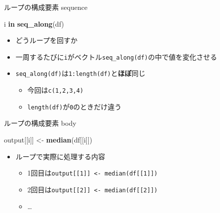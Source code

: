 \documentclass[ignorenonframetext,]{beamer}
\newenvironment{Shaded}{\begin{snugshade}}{\end{snugshade}}
\newcommand{\KeywordTok}[1]{\textcolor[rgb]{0.13,0.29,0.53}{\textbf{#1}}}
\newcommand{\StringTok}[1]{\textcolor[rgb]{0.31,0.60,0.02}{#1}}
\newcommand{\ControlFlowTok}[1]{\textcolor[rgb]{0.13,0.29,0.53}{\textbf{#1}}}
\newcommand{\NormalTok}[1]{#1}
\providecommand{\tightlist}{%
  \setlength{\itemsep}{0pt}\setlength{\parskip}{0pt}}
\begin{document}
\begin{frame}[fragile]{ループの構成要素 sequence}

\begin{Shaded}
\begin{Highlighting}[]
\NormalTok{i }\ControlFlowTok{in} \KeywordTok{seq_along}\NormalTok{(df)}
\end{Highlighting}
\end{Shaded}

\begin{itemize}
\tightlist
\item
  どうループを回すか
\item
  一周するたびに\texttt{i}がベクトル\texttt{seq\_along(df)}の中で値を変化させる
\item
  \texttt{seq\_along(df)}は\texttt{1:length(df)}と\textbf{ほぼ}同じ

  \begin{itemize}
  \tightlist
  \item
    今回は\texttt{c(1,2,3,4)}
  \item
    \texttt{length(df)}が\texttt{0}のときだけ違う
  \end{itemize}
\end{itemize}

\end{frame}

\begin{frame}[fragile]{ループの構成要素 body}

\begin{Shaded}
\begin{Highlighting}[]
\NormalTok{output[[i]] <-}\StringTok{ }\KeywordTok{median}\NormalTok{(df[[i]])}
\end{Highlighting}
\end{Shaded}

\begin{itemize}
\tightlist
\item
  ループで実際に処理する内容

  \begin{itemize}
  \tightlist
  \item
    1回目は\texttt{output{[}{[}1{]}{]}\ \textless{}-\ median(df{[}{[}1{]}{]})}
  \item
    2回目は\texttt{output{[}{[}2{]}{]}\ \textless{}-\ median(df{[}{[}2{]}{]})}
  \item
    \ldots{}
  \end{itemize}
\end{itemize}

\end{frame}
\end{document}
